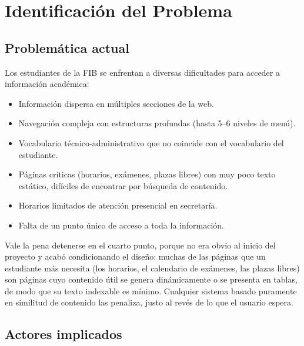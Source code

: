 \documentclass[12pt, a4paper, twoside]{report}
\begin{document}
\chapter{Identificaci\'on del Problema}
\label{ch:problema}

\section{Problem\'atica actual}

Los estudiantes de la FIB se enfrentan a diversas dificultades para acceder a informaci\'on acad\'emica:

\begin{itemize}
  \item Informaci\'on dispersa en m\'ultiples secciones de la web.
  \item Navegaci\'on compleja con estructuras profundas (hasta 5--6 niveles de men\'u).
  \item Vocabulario t\'ecnico-administrativo que no coincide con el vocabulario del estudiante.
  \item P\'aginas cr\'iticas (horarios, ex\'amenes, plazas libres) con muy poco texto est\'atico, dif\'iciles de encontrar por b\'usqueda de contenido.
  \item Horarios limitados de atenci\'on presencial en secretar\'ia.
  \item Falta de un punto \'unico de acceso a toda la informaci\'on.
\end{itemize}

Vale la pena detenerse en el cuarto punto, porque no era obvio al inicio del proyecto y acab\'o condicionando el dise\~no: muchas de las p\'aginas que un estudiante m\'as necesita (los horarios, el calendario de ex\'amenes, las plazas libres) son p\'aginas cuyo contenido \'util se genera din\'amicamente o se presenta en tablas, de modo que su texto indexable es m\'inimo. Cualquier sistema basado puramente en similitud de contenido las penaliza, justo al rev\'es de lo que el usuario espera.

\section{Actores implicados}
\end{document}
